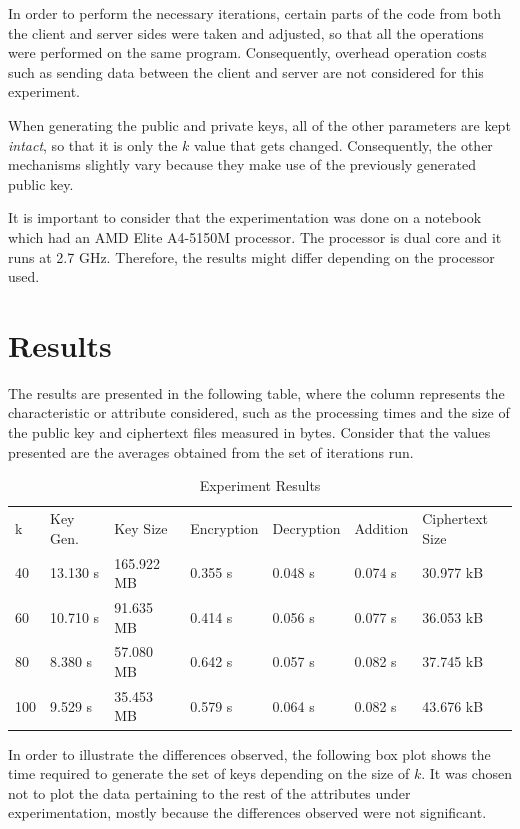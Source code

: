In order to perform the necessary iterations, certain parts of the code from both the client and server sides were taken and adjusted, so that all the operations were performed on the same program. Consequently, overhead operation costs such as sending data between the client and server are not considered for this experiment.

When generating the public and private keys, all of the other parameters are kept \emph{intact}, so that it is only the $k$ value that gets changed. Consequently, the other mechanisms slightly vary because they make use of the previously generated public key.

It is important to consider that the experimentation was done on a notebook which had an AMD Elite A4-5150M processor. The processor is dual core and it runs at 2.7 GHz. Therefore, the results might differ depending on the processor used.

\section{Results}

The results are presented in the following table, where the column represents the characteristic or attribute considered, such as the processing times and the size of the public key and ciphertext files measured in bytes. Consider that the values presented are the averages obtained from the set of iterations run.

\begin{table}[h]
\begin{tabular}{lllllll}
k   & Key Gen. & Key Size  & Encryption & Decryption & Addition & Ciphertext Size \\
40  & 13.130 s & 165.922 MB & 0.355 s    & 0.048 s    & 0.074 s  & 30.977 kB        \\
60  & 10.710 s & 91.635 MB  & 0.414 s    & 0.056 s    & 0.077 s  & 36.053 kB        \\
80  & 8.380 s  & 57.080 MB  & 0.642 s    & 0.057 s    & 0.082 s  & 37.745 kB        \\
100 & 9.529 s  & 35.453 MB  & 0.579 s    & 0.064 s    & 0.082 s  & 43.676 kB
\end{tabular}
\caption{Experiment Results}
\end{table}

In order to illustrate the differences observed, the following box plot shows the time required to generate the set of keys depending on the size of $k$. It was chosen not to plot the data pertaining to the rest of the attributes under experimentation, mostly because the differences observed were not significant.


